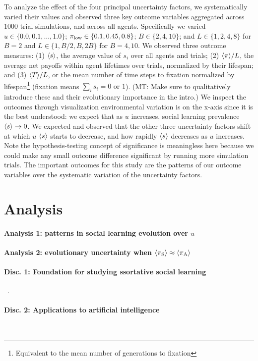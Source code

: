 \documentclass[letterpaper,11.5pt]{scrartcl}
\newcommand{\mt}[1]{{\textcolor{myorange} {({\tiny MT:} #1)}}}
\begin{document}
To analyze the effect of the four principal uncertainty factors, we systematically
varied their values and observed three key outcome variables aggregated across 1000
trial simulations, and across all agents. Specifically we varied $u \in \{0.0,
0.1, \ldots, 1.0\}$; $\pi_{\mathrm{low}} \in \{0.1, 0.45, 0.8\}$; $B \in \{2, 4, 10\}$; and $L
\in \{1,2,4,8\}$ for $B=2$ and $L \in \{1,B/2,B,2B\}$ for $B=4,10$.  We observed
three outcome measures: (1) $\langle s \rangle$, the average value of $s_i$ over all agents
and trials; (2) $\langle \pi \rangle / L$, the average net payoffs within agent lifetimes over
trials, normalized by their lifespan; and (3) $\langle T \rangle / L$, or the mean number
of time steps to fixation normalized by lifespan\footnote{Equivalent to the mean
number of generations to fixation} 
(fixation means $\sum_i s_i = 0 \text{ or } 1$). \mt{Make sure to qualitatively
introduce these and their evolutionary importance in the intro.}
We inspect the outcomes through visualization environmental
variation is on the x-axis since it is the best understood: we expect that as $u$
increases, social learning prevalence $\langle s \rangle \to 0$. We expected and observed
that the other three uncertainty factors shift at which $u$ $\langle s \rangle$ starts to
decrease, and how rapidly $\langle s \rangle$ decreases as $u$ increases. Note the
hypothesis-testing concept of significance is meaningless here because we could
make any small outcome difference significant by running more simulation trials.
The important outcomes for this study are the patterns of our outcome 
variables over the systematic variation of the uncertainty factors.

\section{Analysis}

\paragraph{Analysis 1: patterns in social learning evolution over $u$}

\paragraph{Analysis 2: evolutionary uncertainty when $\langle \pi_\mathrm{S} \rangle \approx \langle \pi_\mathrm{A} \rangle$}

\paragraph{Disc. 1: Foundation for studying ssortative social learning}~\cite{Katsnelson2014}.

\paragraph{Disc. 2: Applications to artificial
intelligence}~\cite{Sandholm1996,Jaques2019,Ndousse2021,Gronauer2022}



\end{document}
